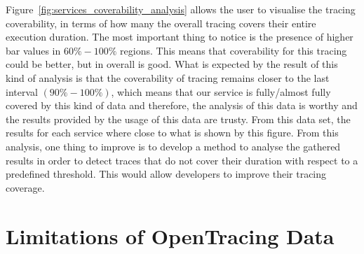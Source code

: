 Figure~\ref{fig:services_coverability_analysis} allows the user to visualise the tracing coverability, in terms of how many the overall tracing covers their entire execution duration. The most important thing to notice is the presence of higher bar values in $60\%-100\%$ regions. This means that coverability for this tracing could be better, but in overall is good. What is expected by the result of this kind of analysis is that the coverability of tracing remains closer to the last interval $(90\%-100\%)$, which means that our service is fully/almost fully covered by this kind of data and therefore, the analysis of this data is worthy and the results provided by the usage of this data are trusty. From this data set, the results for each service where close to what is shown by this figure. From this analysis, one thing to improve is to develop a method to analyse the gathered results in order to detect traces that do not cover their duration with respect to a predefined threshold. This would allow developers to improve their tracing coverage.

\section{Limitations of OpenTracing Data}
\label{sec:limitations_of_opentracing_data}


\checkoddpage
{}
{ %
\newpage
\blankpage}
{ %
}